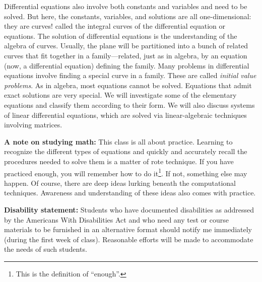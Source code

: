 \documentclass[11pt]{amsart}
\begin{document}
Differential equations also involve both constants and variables and need to be solved. But here, the constants, variables, and solutions are all one-dimensional: they are curves! called the integral curves of the differential equation or equations. The solution of differential equations is the understanding of the algebra of curves. Usually, the plane will be partitioned into a bunch of related curves that fit together in a family---related, just as in algebra, by an equation (now, a differential equation) defining the family. Many problems in differential equations involve finding a special curve in a family. These are called \emph{initial value problems}.
As in algebra, most equations cannot be solved. Equations that admit exact solutions are very special. We will investigate some of the elementary equations and classify them according to their form. We will also discuss systems of linear differential equations, which are solved via linear-algebraic techniques involving matrices.

\textbf{A note on studying math:} This class is all about practice. Learning to recognize the different types of equations and quickly and accurately recall the procedures needed to solve them is a matter of rote technique. If you have practiced enough, you will remember how to do it\footnote{This is the definition of ``enough''.}. If not, something else may happen. Of course, there are deep ideas lurking beneath the computational techniques. Awareness and understanding of these ideas also comes with practice.

\textbf{Disability statement:} Students who have documented disabilities as addressed by the Americans With Disabilities Act and who need any test or course materials to be furnished in an alternative format should notify me immediately (during the first week of class).  Reasonable efforts will be made to accommodate the needs of such students.
\end{document}
